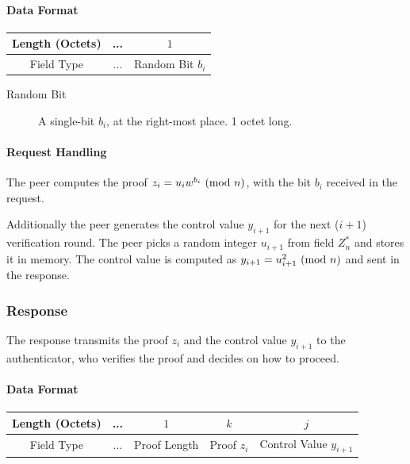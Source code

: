 \paragraph{Data Format}

\begin{center}
\begin{tabular}{|c|c|c|}
	\hline
	Length (Octets) & ... & $1$ \\
	\hline
	Field Type & ... & Random Bit $b_i$\\
	\hline
\end{tabular}
\end{center}

\begin{description}
	\item[Random Bit] A single-bit $b_i$, at the right-most place. 1 octet long.
\end{description}

\paragraph{Request Handling}
The peer computes the proof $z_i = u_iw^{b_i} \ (\mathrm{mod}\ n)$, with the bit $b_i$ received in the request.

Additionally the peer generates the control value $y_{i+1}$ for the next ($i+1$) verification round.
The peer picks a random integer $u_{i+1}$ from field $Z^*_n$ and stores it in memory.
The control value is computed as $y_{i+1} = u_{i+1}^2 \ (\mathrm{mod}\ n)$ and sent in the response.

\subsubsection{Response}

The response transmits the proof $z_i$ and the control value $y_{i+1}$ to the authenticator, who verifies the proof and decides on how to proceed.
\paragraph{Data Format}

\begin{center}
\begin{tabular}{|c|c|c|c|c|}
	\hline
	Length (Octets) & ... & $1$ & $k $ & $j$\\
	\hline
	Field Type & ... & Proof Length & Proof $z_i$ & Control Value $y_{i+1}$\\
	\hline
\end{tabular}
\end{center}


